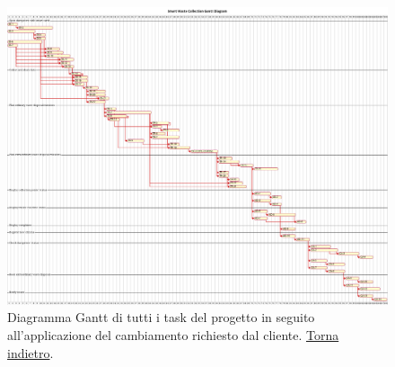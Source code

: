 \begin{figure}[H]
    \centering
    \includegraphics[width=\textwidth]{../img/gantt-redefinition.pm}
    \caption{Diagramma Gantt di tutti i task del progetto in seguito all'applicazione del cambiamento richiesto dal cliente.  \hyperlink{back:gantt-redefinition}{Torna indietro}.}
    \label{fig:gantt-redefinition}
\end{figure}
